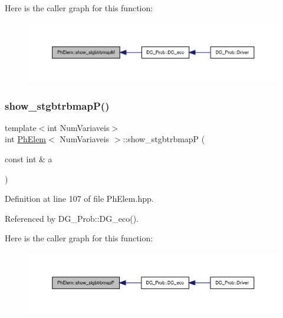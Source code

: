 Here is the caller graph for this function\+:
\nopagebreak
\begin{figure}[H]
\begin{center}
\leavevmode
\includegraphics[width=350pt]{classPhElem_a5f0e8811ea30343e51e4be9ff40d2b74_icgraph}
\end{center}
\end{figure}
\mbox{\label{classPhElem_a3d9e8990f4442e3b17e1cce3c9af19e9}} 
\subsubsection{\texorpdfstring{show\+\_\+stgbtrbmap\+P()}{show\_stgbtrbmapP()}}
{\footnotesize\ttfamily template$<$int Num\+Variaveis$>$ \\
int \hyperlink{classPhElem}{Ph\+Elem}$<$ Num\+Variaveis $>$\+::show\+\_\+stgbtrbmapP (\begin{DoxyParamCaption}\item[{const int \&}]{a }\end{DoxyParamCaption})\hspace{0.3cm}{\ttfamily [inline]}}



Definition at line 107 of file Ph\+Elem.\+hpp.



Referenced by D\+G\+\_\+\+Prob\+::\+D\+G\+\_\+eco().

Here is the caller graph for this function\+:
\nopagebreak
\begin{figure}[H]
\begin{center}
\leavevmode
\includegraphics[width=350pt]{classPhElem_a3d9e8990f4442e3b17e1cce3c9af19e9_icgraph}
\end{center}
\end{figure}
\mbox{\label{classPhElem_a27e7bc9ed0ea64d609d4d0b29baba468}} 
